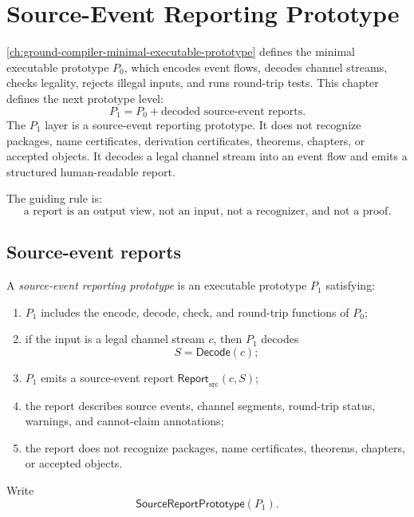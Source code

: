 \chapter{Source-Event Reporting Prototype}
\label{ch:ground-compiler-source-event-reporting-prototype}

\autoref{ch:ground-compiler-minimal-executable-prototype} defines the minimal executable prototype $P_0$, which encodes event flows, decodes channel streams, checks legality, rejects illegal inputs, and runs round-trip tests. This chapter defines the next prototype level:
$$
  \boxed{P_1=P_0+\text{decoded source-event reports}.}
$$
The $P_1$ layer is a source-event reporting prototype. It does not recognize packages, name certificates, derivation certificates, theorems, chapters, or accepted objects. It decodes a legal channel stream into an event flow and emits a structured human-readable report.

The guiding rule is:
$$
  \boxed{\text{a report is an output view, not an input, not a recognizer, and not a proof}.}
$$

\section{Source-event reports}
\label{sec:source-report-reports}

\begin{definition}
\label{def:source-report-prototype}
A \emph{source-event reporting prototype} is an executable prototype $P_1$ satisfying:
\begin{enumerate}
\item $P_1$ includes the encode, decode, check, and round-trip functions of $P_0$;
\item if the input is a legal channel stream $c$, then $P_1$ decodes
$$
  S=\mathsf{Decode}(c);
$$
\item $P_1$ emits a source-event report $\mathsf{Report}_{\mathrm{src}}(c,S)$;
\item the report describes source events, channel segments, round-trip status, warnings, and cannot-claim annotations;
\item the report does not recognize packages, name certificates, theorems, chapters, or accepted objects.
\end{enumerate}
Write
$$
  \mathsf{SourceReportPrototype}(P_1).
$$
\end{definition}

